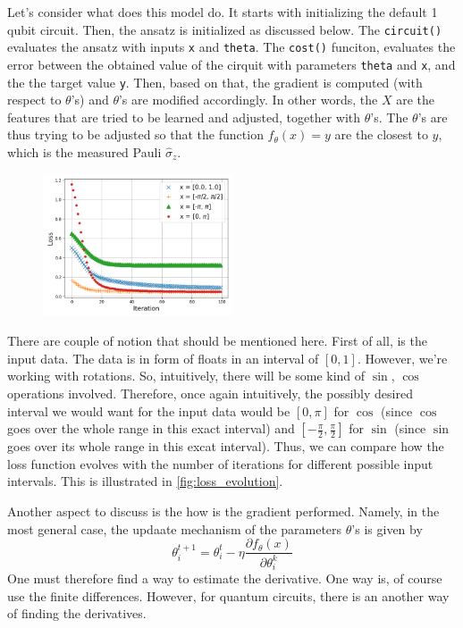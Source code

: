 Let's consider what does this model do. It starts with initializing the default 1 qubit 
circuit. Then, the ansatz is initialized as discussed below. The \texttt{circuit()} evaluates the 
ansatz with inputs \texttt{x} and \texttt{theta}. The \texttt{cost()} funciton, evaluates the error 
between the obtained value of the cirquit with parameters \texttt{theta} and \texttt{x}, and the 
the target value \texttt{y}.
Then, based on that, the gradient is computed (with respect to $\theta$'s) and $\theta$'s are modified accordingly.
In other words, the $X$ are the features that are tried to be learned and adjusted, together with $\theta$'s. 
The $\theta$'s are thus trying to be adjusted so that the function $f_\theta(x) = y$ are the closest to $y$, which is the 
measured Pauli $\widehat{\sigma}_z$.

\begin{figure}
  \centering
  \includegraphics[width=0.5\textwidth]{loss_different_intervals.png}
  \caption{}
  \label{fig:loss_evolution}
\end{figure}
There are couple of notion that should be mentioned here. First of all, is the input data. 
The data is in form of floats in an interval of $[0,1]$. However, we're working with rotations. So, intuitively, 
there will be some kind of $\sin$, $\cos$ operations involved. Therefore, once again intuitively, the possibly 
desired interval we would want for the input data would be $[0, \pi]$ for $\cos$ 
(since $\cos$ goes over the whole range in this exact interval) and $[-\frac{\pi}{2}, \frac{\pi}{2}]$ for $\sin$ 
(since $\sin$ goes over its whole range in this excat interval).
Thus, we can compare how the loss function evolves with the number of iterations for different possible input intervals. 
This is illustrated in \autoref{fig:loss_evolution}.

Another aspect to discuss is the how is the gradient performed. Namely, in the most general case, the 
updaate mechanism of the parameters $\theta$'s is given by 
\begin{equation}
  \theta_i^{t+1} = \theta_i^{t} - \eta \frac{\partial f_\theta(x)}{\partial \theta_i^{k}}
\end{equation}
One must therefore find a way to estimate the derivative. One way is, of course use the finite differences. 
However, for quantum circuits, there is an another way of finding the derivatives.

















